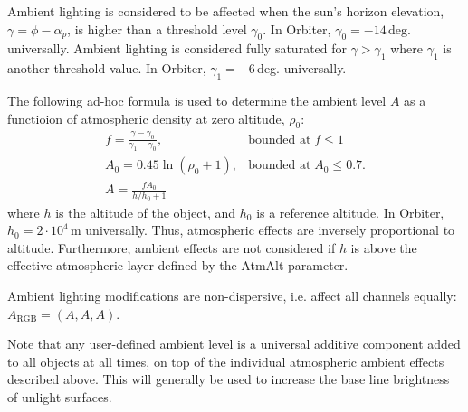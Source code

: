 \documentclass[a4paper]{article}
\begin{document}
Ambient lighting is considered to be affected when the sun's horizon elevation, $\gamma = \phi-\alpha_p$, is higher than a threshold level $\gamma_0$. In Orbiter, $\gamma_0 = -14$\,deg. universally. Ambient lighting is considered fully saturated for $\gamma > \gamma_1$ where $\gamma_1$ is another threshold value. In Orbiter, $\gamma_1 = +6$\,deg. universally.

The following ad-hoc formula is used to determine the ambient level $A$ as a functioion of atmospheric density at zero altitude, $\rho_0$:
\begin{equation}
\begin{array}{ll}
f = \frac{\gamma-\gamma_0}{\gamma_1-\gamma_0}, & \text{bounded at}\; f \leq 1\\
A_0 = 0.45 \ln(\rho_0+1), & \text{bounded at}\; A_0 \leq 0.7.\\
A = \frac{f A_0}{h/h_0 +1} &
\end{array}
\end{equation}
where $h$ is the altitude of the object, and $h_0$ is a reference altitude. In Orbiter, $h_0 = 2\cdot10^4$\,m universally. Thus, atmospheric effects are inversely proportional to altitude. Furthermore, ambient effects are not considered if $h$ is above the effective atmospheric layer defined by the AtmAlt parameter.

Ambient lighting modifications are non-dispersive, i.e. affect all channels equally: $A_\text{RGB} = (A,A,A)$.

Note that any user-defined ambient level is a universal additive component added to all objects at all times, on top of the individual atmospheric ambient effects described above. This will generally be used to increase the base line brightness of unlight surfaces.
\end{document}
